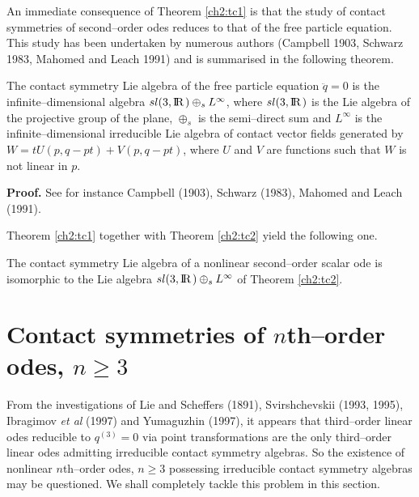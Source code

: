 An immediate consequence of Theorem \ref{ch2:tc1} is that the study of contact
symmetries of second--order odes reduces to that of the free particle
equation. This study has been undertaken by numerous authors (Campbell 1903,
Schwarz 1983, Mahomed and Leach 1991) and is summarised in the following
theorem.
\begin{theo}
\label{ch2:tc2}
\begin{em}
The contact symmetry Lie algebra of the free particle equation $\ddot q=0$ is
the infinite--dimensional algebra $sl(3,\mathrm{I\!R\!}\;)\oplus_s L^{\infty}$, where
$sl(3,\mathrm{I\!R\!}\;)$ is the Lie algebra of the projective group of the plane,
$\oplus_s$ is the semi--direct sum and
$L^{\infty}$ is the infinite--dimensional irreducible Lie algebra of contact
vector fields generated by $W=tU(p,q-pt)+V(p,q-pt)$, where $U$ and $V$ are
functions such that $W$ is not linear in $p$.
\end{em}
\end{theo}
{\bf Proof.} See for instance Campbell (1903), Schwarz (1983),
Mahomed and Leach (1991).

Theorem \ref{ch2:tc1} together with Theorem \ref{ch2:tc2} yield the following one.
\begin{theo}
\begin{em}
The contact symmetry Lie algebra of a nonlinear second--order scalar ode is
isomorphic to the Lie algebra $sl(3,\mathrm{I\!R\!}\;)\oplus_s L^{\infty}$
of Theorem \ref{ch2:tc2}.
\end{em}
\end{theo}

\section{Contact symmetries of $n$th--order odes, $n\ge 3$}
From the investigations of Lie and Scheffers (1891), Svirshchevskii (1993, 1995),
Ibragimov {\em et al} (1997) and Yumaguzhin (1997), it appears that
third--order linear
odes reducible to $q^{(3)}=0$ via point transformations  are the only
third--order linear odes admitting irreducible contact symmetry algebras.
So the existence of
nonlinear $n$th--order odes, $n\ge 3$ possessing irreducible contact symmetry
algebras may be questioned. We shall completely tackle this problem in this
section.

